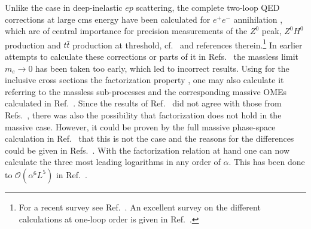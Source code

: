 \vspace*{1mm}
\noindent
Unlike the case in deep-inelastic $ep$ scattering, the complete two-loop QED corrections at large cms energy 
have been calculated for $e^+ e^-$ annihilation \cite{Blumlein:2020jrf}, 
which are of central importance for precision measurements of the $Z^0$ peak, $Z^0 H^0$ production and $t\bar{t}$ 
production at threshold, cf.~\cite{Blumlein:2019pqb} and references therein.\footnote{For a recent survey see 
Ref.~\cite{Blumlein:2022mrp}. An excellent survey on the different calculations at one-loop order is given in 
Ref.~\cite{BP}.}
In earlier attempts to 
calculate these corrections or parts of it in Refs.~\cite{Berends:1987ab,Kniehl:1988id} the massless limit $m_e 
\rightarrow 0$ has been taken too early, which led to incorrect results. Using for the inclusive cross 
sections the factorization property \cite{Buza:1995ie}, one may also calculate it referring to the massless 
sub-processes \cite{Hamberg:1990np,Harlander:2002wh,Blumlein:2019srk} and the corresponding massive OMEs calculated in Ref.~\cite{Blumlein:2011mi}. Since the results of Ref.~\cite{Blumlein:2011mi} did not agree 
with those from Refs.~\cite{Berends:1987ab,Kniehl:1988id}, there was also the possibility that factorization does not 
hold in the massive case. However, it could be proven by the full massive phase-space calculation in Ref.~\cite{Blumlein:2020jrf} that this is not the case and the reasons for the differences could be given in Refs.~\cite{Blumlein:2020jrf,Blumlein:2019srk,Blumlein:2019pqb}. With the factorization relation at hand one can now 
calculate the three most leading logarithms in any order of $\alpha$. This has been done to $\mathcal{O}(\alpha^6 L^5)$ in 
Ref.~\cite{Ablinger:2020qvo}. 

